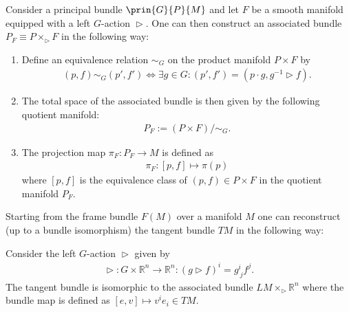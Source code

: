     \begin{construct}\label{diff:prin:associated_bundle}
        Consider a principal bundle $\prin{G}{P}{M}$ and let $F$ be a smooth manifold equipped with a left $G$-action $\vartriangleright$. One can then construct an associated bundle $P_F \equiv P \times_\vartriangleright F$ in the following way:
        \begin{enumerate}
            \item Define an equivalence relation $\sim_G$ on the product manifold $P\times F$ by
                \begin{gather}
                    \label{diff:prin:associated_bundle_equivalence}
                    (p, f)\sim_G (p', f')\iff \exists g\in G: (p', f') = (p\cdot g, g^{-1}\vartriangleright f).
                \end{gather}
            \item The total space of the associated bundle is then given by the following quotient manifold:
                \begin{gather}
                    P_F := (P\times F)/\sim_G.
                \end{gather}
            \item The projection map $\pi_F:P_F\rightarrow M$ is defined as
                \begin{gather}
                    \pi_F:[p, f]\mapsto \pi(p)
                \end{gather}
            where $[p, f]$ is the equivalence class of $(p, f)\in P\times F$ in the quotient manifold $P_F$.
        \end{enumerate}
    \end{construct}

    \begin{example}
        Starting from the frame bundle $F(M)$ over a manifold $M$ one can reconstruct (up to a bundle isomorphism) the tangent bundle $TM$ in the following way:

        Consider the left $G$-action $\vartriangleright$ given by
        \begin{gather}
            \vartriangleright:G\times\mathbb{R}^n\rightarrow\mathbb{R}^n : (g\vartriangleright f)^i = g^i_{\ j}f^j.
        \end{gather}
        The tangent bundle is isomorphic to the associated bundle $LM\times_\vartriangleright \mathbb{R}^n$ where the bundle map is defined as $[e, v]\mapsto v^ie_i \in TM$.
    \end{example}

